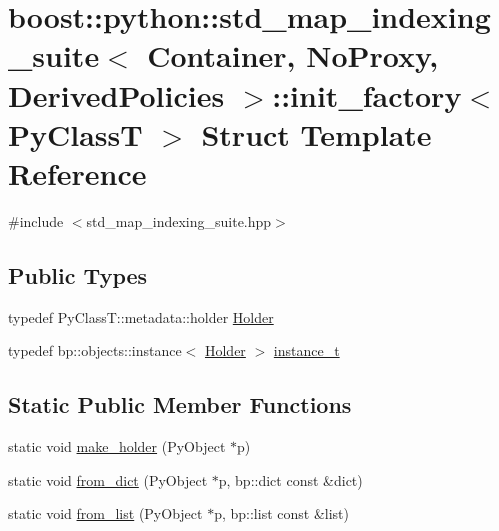 \hypertarget{structboost_1_1python_1_1std__map__indexing__suite_1_1init__factory}{}\section{boost\+:\+:python\+:\+:std\+\_\+map\+\_\+indexing\+\_\+suite$<$ Container, No\+Proxy, Derived\+Policies $>$\+:\+:init\+\_\+factory$<$ Py\+ClassT $>$ Struct Template Reference}
\label{structboost_1_1python_1_1std__map__indexing__suite_1_1init__factory}


{\ttfamily \#include $<$std\+\_\+map\+\_\+indexing\+\_\+suite.\+hpp$>$}

\subsection*{Public Types}
\begin{DoxyCompactItemize}
\item 
typedef Py\+Class\+T\+::metadata\+::holder \hyperlink{structboost_1_1python_1_1std__map__indexing__suite_1_1init__factory_a785b4c017210dd048b47eb6c04a5cdc6}{Holder}
\item 
typedef bp\+::objects\+::instance$<$ \hyperlink{structboost_1_1python_1_1std__map__indexing__suite_1_1init__factory_a785b4c017210dd048b47eb6c04a5cdc6}{Holder} $>$ \hyperlink{structboost_1_1python_1_1std__map__indexing__suite_1_1init__factory_aea2971d45c2f4de6ac83494b504d9a19}{instance\+\_\+t}
\end{DoxyCompactItemize}
\subsection*{Static Public Member Functions}
\begin{DoxyCompactItemize}
\item 
static void \hyperlink{structboost_1_1python_1_1std__map__indexing__suite_1_1init__factory_acd1c1789efbbb4f595abae51b1f0a2a0}{make\+\_\+holder} (Py\+Object $\ast$p)
\item 
static void \hyperlink{structboost_1_1python_1_1std__map__indexing__suite_1_1init__factory_aa1f0944f15cb284c240d25bfa6f0ccca}{from\+\_\+dict} (Py\+Object $\ast$p, bp\+::dict const \&dict)
\item 
static void \hyperlink{structboost_1_1python_1_1std__map__indexing__suite_1_1init__factory_ad0dbf8e2c1b8fa7dd7ecf87415e7d3fb}{from\+\_\+list} (Py\+Object $\ast$p, bp\+::list const \&list)
\end{DoxyCompactItemize}


